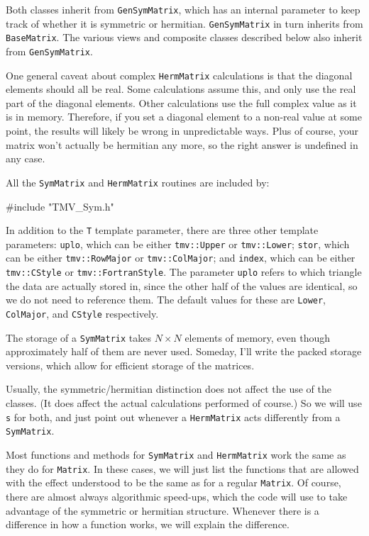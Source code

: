\documentclass[twoside,letterpaper,11pt]{article}
\renewcommand{\tt}[1]{{\lstinline {#1}}}
\begin{document}
Both classes inherit from \tt{GenSymMatrix},
which has an internal parameter to keep track
of whether it is symmetric or hermitian.
\tt{GenSymMatrix} in turn inherits from \tt{BaseMatrix}.  
The various views and composite classes described below 
also inherit from \tt{GenSymMatrix}.

One general caveat about complex \tt{HermMatrix} calculations is that the diagonal
elements should all be real.  Some calculations assume this, and only 
use the real part of the diagonal elements.  Other calculations use the 
full complex value as it is in memory.  Therefore, if you set a diagonal element 
to a non-real value at some point, the results will likely be wrong in
unpredictable ways.  Plus of course, your matrix won't actually be hermitian any more,
so the right answer is undefined in any case.

All the \tt{SymMatrix} and \tt{HermMatrix} routines are included by:
\begin{tmvcode}
#include "TMV_Sym.h"
\end{tmvcode}

In addition to the \tt{T} template parameter, there are three other template 
parameters: \tt{uplo}, which can be either \tt{tmv::Upper} or \tt{tmv::Lower};
\tt{stor}, which can be either \tt{tmv::RowMajor} or \tt{tmv::ColMajor}; and
\tt{index}, which can be either \tt{tmv::CStyle} or \tt{tmv::FortranStyle}.
The parameter \tt{uplo} refers to which triangle the data are actually stored in, 
since the
other half of the values are identical, so we do not need to reference them.
The default values for these are \tt{Lower}, \tt{ColMajor}, and \tt{CStyle}
respectively.

The storage of a \tt{SymMatrix} takes
$N \times N$ elements of memory, even though approximately half of them 
are never used.  Someday, I'll write the packed storage versions, which allow for
efficient storage of the matrices.

Usually, the symmetric/hermitian distinction does not affect the use of the classes.
(It does affect the actual calculations performed of course.)  So we will use 
\tt{s} for both, and just point out whenever a \tt{HermMatrix} acts differently
from a \tt{SymMatrix}.

Most functions and methods for \tt{SymMatrix} and \tt{HermMatrix}
work the same as they do for \tt{Matrix}.
In these cases, we will just list the functions that are allowed with the
effect understood to be the same as for a regular \tt{Matrix}.  Of course, there are 
almost always algorithmic speed-ups, which the code will use to take advantage of the 
symmetric or hermitian structure.
Whenever there is a difference in how a function works,
we will explain the difference.
\end{document}
